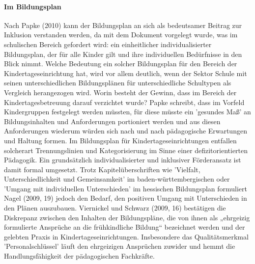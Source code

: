 \paragraph{Im Bildungsplan}
Nach Papke (2010) kann der Bildungsplan an sich als bedeutsamer Beitrag zur Inklusion verstanden werden, da mit dem Dokument vorgelegt wurde, was im schulischen Bereich gefordert wird: ein einheitlicher individualisierter Bildungsplan, der für alle Kinder gilt und ihre individuellen Bedürfnisse in den Blick nimmt. Welche Bedeutung ein solcher Bildungsplan für den Bereich der Kindertageseinrichtung hat, wird vor allem deutlich, wenn der Sektor Schule mit seinen unterschiedlichen Bildungsplänen für unterschiedliche Schultypen als Vergleich herangezogen wird. Worin besteht der Gewinn, dass im Bereich der Kindertagesbetreuung darauf verzichtet wurde? Papke schreibt, dass im Vorfeld Kindergruppen festgelegt werden müssten, für diese müsste ein 'gesundes Maß' an Bildungsinhalten und Anforderungen portioniert werden und aus diesen Anforderungen wiederum würden sich nach und nach pädagogische Erwartungen und Haltung formen. Im Bildungsplan für Kindertageseinrichtungen entfallen solcherart Trennungslinien und Kategorisierung im Sinne einer defizitorientierten Pädagogik. Ein grundsätzlich individualisierter und inklusiver Förderansatz ist damit formal umgesetzt. Trotz Kapitelüberschriften wie 'Vielfalt, Unterschiedlichkeit und Gemeinsamkeit' im baden-württembergischen oder 'Umgang mit individuellen Unterschieden' im hessischen Bildungsplan formuliert Nagel (2009, 19) jedoch den Bedarf, den positiven Umgang mit Unterschieden in den Plänen auszubauen. Viernickel und Schwarz (2009, 16) bestätigen die Diskrepanz zwischen den Inhalten der Bildungspläne, die von ihnen als „ehrgeizig formulierte Ansprüche an die frühkindliche Bildung“ bezeichnet werden und der gelebten Praxis in Kindertageseinrichtungen. Insbesondere das Qualitätsmerkmal 'Personalschlüssel' läuft den ehrgeizigen Ansprüchen zuwider und hemmt die Handlungsfähigkeit der pädagogischen Fachkräfte.

